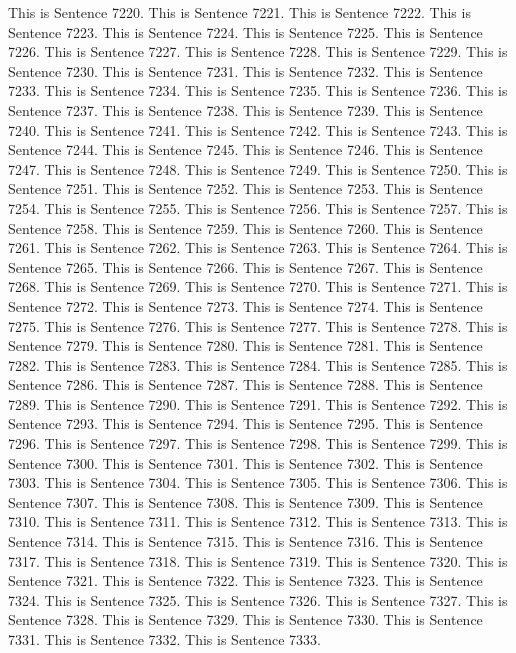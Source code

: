 \documentclass{article}
\begin{document}
This is Sentence 7220.
This is Sentence 7221.
This is Sentence 7222.
This is Sentence 7223.
This is Sentence 7224.
This is Sentence 7225.
This is Sentence 7226.
This is Sentence 7227.
This is Sentence 7228.
This is Sentence 7229.
This is Sentence 7230.
This is Sentence 7231.
This is Sentence 7232.
This is Sentence 7233.
This is Sentence 7234.
This is Sentence 7235.
This is Sentence 7236.
This is Sentence 7237.
This is Sentence 7238.
This is Sentence 7239.
This is Sentence 7240.
This is Sentence 7241.
This is Sentence 7242.
This is Sentence 7243.
This is Sentence 7244.
This is Sentence 7245.
This is Sentence 7246.
This is Sentence 7247.
This is Sentence 7248.
This is Sentence 7249.
This is Sentence 7250.
This is Sentence 7251.
This is Sentence 7252.
This is Sentence 7253.
This is Sentence 7254.
This is Sentence 7255.
This is Sentence 7256.
This is Sentence 7257.
This is Sentence 7258.
This is Sentence 7259.
This is Sentence 7260.
This is Sentence 7261.
This is Sentence 7262.
This is Sentence 7263.
This is Sentence 7264.
This is Sentence 7265.
This is Sentence 7266.
This is Sentence 7267.
This is Sentence 7268.
This is Sentence 7269.
This is Sentence 7270.
This is Sentence 7271.
This is Sentence 7272.
This is Sentence 7273.
This is Sentence 7274.
This is Sentence 7275.
This is Sentence 7276.
This is Sentence 7277.
This is Sentence 7278.
This is Sentence 7279.
This is Sentence 7280.
This is Sentence 7281.
This is Sentence 7282.
This is Sentence 7283.
This is Sentence 7284.
This is Sentence 7285.
This is Sentence 7286.
This is Sentence 7287.
This is Sentence 7288.
This is Sentence 7289.
This is Sentence 7290.
This is Sentence 7291.
This is Sentence 7292.
This is Sentence 7293.
This is Sentence 7294.
This is Sentence 7295.
This is Sentence 7296.
This is Sentence 7297.
This is Sentence 7298.
This is Sentence 7299.
This is Sentence 7300.
This is Sentence 7301.
This is Sentence 7302.
This is Sentence 7303.
This is Sentence 7304.
This is Sentence 7305.
This is Sentence 7306.
This is Sentence 7307.
This is Sentence 7308.
This is Sentence 7309.
This is Sentence 7310.
This is Sentence 7311.
This is Sentence 7312.
This is Sentence 7313.
This is Sentence 7314.
This is Sentence 7315.
This is Sentence 7316.
This is Sentence 7317.
This is Sentence 7318.
This is Sentence 7319.
This is Sentence 7320.
This is Sentence 7321.
This is Sentence 7322.
This is Sentence 7323.
This is Sentence 7324.
This is Sentence 7325.
This is Sentence 7326.
This is Sentence 7327.
This is Sentence 7328.
This is Sentence 7329.
This is Sentence 7330.
This is Sentence 7331.
This is Sentence 7332.
This is Sentence 7333.
\end{document}
